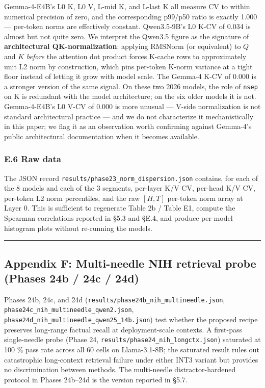 \documentclass[
]{article}
\begin{document}
Gemma-4-E4B's L0 K, L0 V, L-mid K, and L-last K all measure CV to within
numerical precision of zero, and the corresponding p99/p50 ratio is
exactly 1.000 --- per-token norms are effectively constant. Qwen3.5-9B's
L0 K-CV of 0.034 is almost but not quite zero. We interpret the Qwen3.5
figure as the signature of \textbf{architectural QK-normalization}:
applying RMSNorm (or equivalent) to \(Q\) and \(K\) \emph{before} the
attention dot product forces K-cache rows to approximately unit L2 norm
by construction, which pins per-token K-norm variance at a tight floor
instead of letting it grow with model scale. The Gemma-4 K-CV of 0.000
is a stronger version of the same signal. On these two 2026 models, the
role of \texttt{nsep} on K is redundant with the model architecture; on
the six older models it is not. Gemma-4-E4B's L0 V-CV of 0.000 is more
unusual --- V-side normalization is not standard architectural practice
--- and we do not characterize it mechanistically in this paper; we flag
it as an observation worth confirming against Gemma-4's public
architectural documentation when it becomes available.

\subsubsection{E.6 Raw data}\label{e.6-raw-data}

The JSON record \texttt{results/phase23\_norm\_dispersion.json}
contains, for each of the 8 models and each of the 3 segments, per-layer
K/V CV, per-head K/V CV, per-token L2 norm percentiles, and the raw
\([H, T]\) per-token norm array at Layer 0. This is sufficient to
regenerate Table 2b / Table E1, compute the Spearman correlations
reported in §5.3 and §E.4, and produce per-model histogram plots without
re-running the models.

\begin{center}\rule{0.5\linewidth}{0.5pt}\end{center}

\subsection{Appendix F: Multi-needle NIH retrieval probe (Phases 24b /
24c /
24d)}\label{appendix-f-multi-needle-nih-retrieval-probe-phases-24b-24c-24d}

Phases 24b, 24c, and 24d
(\texttt{results/phase24b\_nih\_multineedle.json},
\texttt{phase24c\_nih\_multineedle\_qwen2.json},
\texttt{phase24d\_nih\_multineedle\_qwen25\_14b.json}) test whether the
proposed recipe preserves long-range factual recall at deployment-scale
contexts. A first-pass single-needle probe (Phase 24,
\texttt{results/phase24\_nih\_longctx.json}) saturated at 100 \% pass
rate across all 60 cells on Llama-3.1-8B; the saturated result rules out
catastrophic long-context retrieval failure under either INT3 variant
but provides no discrimination between methods. The multi-needle
distractor-hardened protocol in Phases 24b--24d is the version reported
in §5.7.
\end{document}
